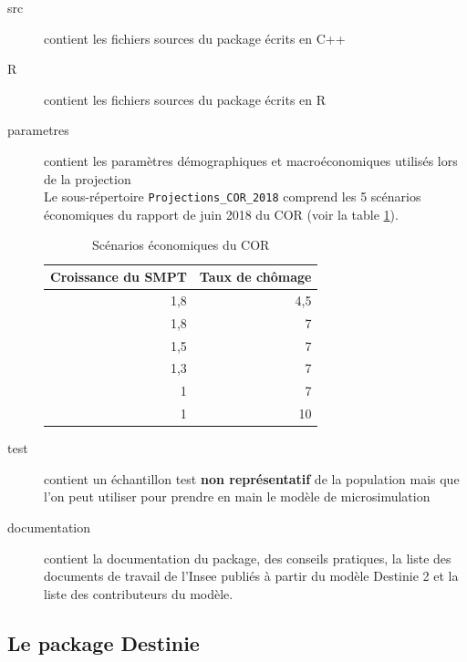 	\begin{description}
		\item[src] contient les fichiers sources du package écrits en C++
		\item[R] contient les fichiers sources du package écrits en R
		\item[parametres] contient les paramètres démographiques et macroéconomiques utilisés lors de la projection\\
Le sous-répertoire {\tt Projections\_COR\_2018} comprend les 5 scénarios économiques du rapport de juin 2018 du COR (voir la table \ref{tab:hypscCOR}). 
\renewcommand{\arraystretch}{1.8}

\begin{table}[h]
  \centering
  \caption{Scénarios économiques du COR}
    \begin{tabular}{rr}
    \toprule
 Croissance du SMPT & Taux de chômage \\
    \midrule
 1,8     & 4,5 \\
 1,8   & 7 \\
 1,5   & 7 \\
 1,3   & 7 \\
 1     & 7 \\
 1     & 10 \\
    \bottomrule
    \end{tabular}%
  \label{tab:hypscCOR}%
\end{table}%
		\item[test] contient un échantillon test \textbf{non représentatif} de la population mais que l'on peut utiliser pour prendre en main le modèle de microsimulation
		\item[documentation] contient la documentation du package, des conseils pratiques, la liste des documents de travail de l'Insee publiés à partir du modèle Destinie 2 et la liste des contributeurs du modèle.
	\end{description}






\subsection{Le package Destinie}


